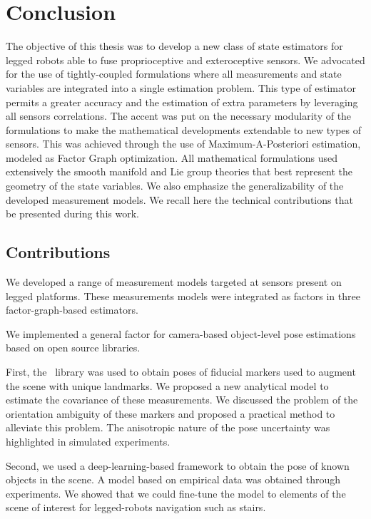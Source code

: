 \chapter{Conclusion}

The objective of this thesis was to develop a new class of state estimators for legged robots able to fuse proprioceptive and exteroceptive
sensors. We advocated for the use of tightly-coupled formulations where all measurements and state variables are integrated into a single estimation 
problem. This type of estimator permits a greater accuracy and the estimation of extra parameters by leveraging all sensors correlations.
The accent was put on the necessary modularity of the formulations to make the mathematical developments extendable to new types of sensors. This 
was achieved through the use of Maximum-A-Posteriori estimation, modeled as Factor Graph optimization. All mathematical formulations used extensively the smooth manifold
and Lie group theories that best represent the geometry of the state variables. We also emphasize the generalizability of the developed measurement models. 
We recall here the technical contributions that be presented during this work.

\section{Contributions}

We developed a range of measurement models targeted at sensors present on legged platforms. These measurements models were integrated as factors in 
three factor-graph-based estimators.

\bigskip

We implemented a general factor for camera-based object-level pose estimations based on open source libraries. 

First, the \apriltag\ library was used 
to obtain poses of fiducial markers used to augment the scene with unique landmarks. We proposed a new analytical model to estimate the covariance of 
these measurements. We discussed the problem of the orientation ambiguity of these markers and proposed a practical method to alleviate this problem.
The anisotropic nature of the pose uncertainty was highlighted in simulated experiments. 

Second, we used a deep-learning-based framework to obtain the pose of known objects in the scene. A model based on empirical data was obtained through
experiments. We showed that we could fine-tune the model to elements of the scene of interest for legged-robots navigation such as stairs.

